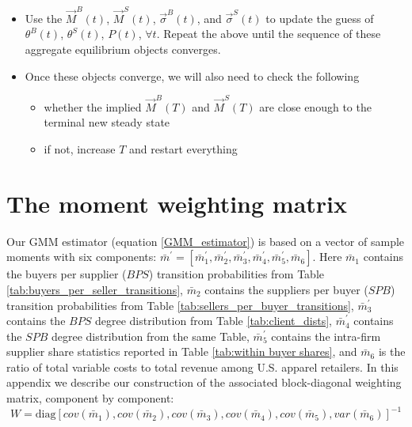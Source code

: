\documentclass[12pt]{article} \usepackage{amsmath,amssymb,amsthm,geometry,graphicx,setspace,algorithm,algpseudocode,float}
\begin{document}
\begin{itemize}
      \begin{eqnarray*}
	\vec{M}^S(t+\Delta t) = \vec{M}^S(t) + Q^S(t)^{\prime} \vec{M}^S(t)\Delta t
       \end{eqnarray*}
\item Use the $\vec{M}^B(t)$, $\vec{M}^S(t)$, $\vec{\sigma}^B(t)$, and $\vec{\sigma}^S(t)$ to update the guess of $\theta^B(t)$, $\theta^S(t)$, $P(t)$, $\forall t$. Repeat the above until the sequence of these aggregate equilibrium objects converges. 
\item Once these objects converge, we will also need to check the following
	\begin{itemize}
	\item whether the implied $\vec{M}^B(T)$ and $\vec{M}^S(T)$ are close enough to the terminal new steady state
	\item if not, increase $T$ and restart everything
	\end{itemize}
 \end{itemize}
\section{The moment weighting matrix}

\label{sec:weighting_matrix}Our GMM estimator (equation \ref{GMM_estimator}) is based on a vector of sample
moments with six components: $\bar{m}^{\prime }=\left[ \bar{m}_{1}^{\prime
},\bar{m}_{2}^{\prime },\bar{m}_{3}^{\prime },\bar{m}_{4}^{\prime },\bar{m}%
_{5}^{\prime },\bar{m}_{6}\right] .$ Here $\bar{m}_{1}$ contains the buyers per supplier ($%
BPS$) transition probabilities from Table \ref{tab:buyers_per_seller_transitions}, $\bar{m}_{2}$ contains the suppliers per buyer ($SPB$) transition probabilities from Table \ref{tab:sellers_per_buyer_transitions}, $\bar{m}%
_{3}^{\prime }$ contains the $BPS$ degree distribution from Table \ref{tab:client_dists}, $%
\bar{m}_{4}^{\prime }$ contains the $SPB$ degree distribution from the same
Table, $\bar{m}_{5}^{\prime }$ contains the intra-firm supplier share
statistics reported in Table \ref{tab:within buyer shares}, and $\bar{m}_{6}$ is the ratio of total variable costs to total revenue among U.S. apparel retailers. In this appendix we describe our
construction of the associated block-diagonal weighting matrix, component by
component:%
\begin{equation*}
W=\text{diag}\left[ cov(\bar{m}_{1}),cov(\bar{m}_{2}),cov(\bar{m}_{3}),cov(%
\bar{m}_{4}),cov(\bar{m}_{5}),var{(\bar{m}_6)}\right] ^{-1}
\end{equation*}
\end{document}
